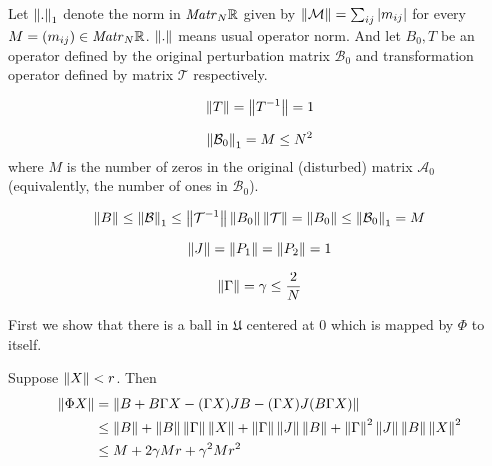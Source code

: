 \documentclass{article}
\begin{document}
\begin{propose}
    Let ${\left\|{.}\right\|}_{1}$ denote the norm in $\mathit{Matr}_{N} {\mathbb{R}}$ given by
    $\left\|{\mathcal M}\right\| = \sum_{ij} \left|m_{ij}\right|$ for every $M=(m_{ij})\in\mathit{Matr}_{N} {\mathbb{R}}$.
    $\left\|{.}\right\|$ means usual operator norm.
    And let $B_0, T$ be an operator defined by the original perturbation matrix $\mathcal B_0$
    and transformation operator defined by matrix $\mathcal T$ respectively.

    $$\left\|{T}\right\| = \left\|{T^{-1}}\right\| = 1$$

    $$\left\|{\mathcal B_0}\right\|_1 = M \leq N^2$$
    where $M$ is the number of zeros in the original (disturbed) matrix $\mathcal A_0$
    (equivalently, the number of ones in $\mathcal B_0$).

    $$\left\|{B}\right\| \leq {\left\|{\mathcal B}\right\|}_{1} \leq \left\|{\mathcal T^{-1}}\right\| \left\|{B_0}\right\| \left\|{\mathcal T}\right\| = \left\|{B_0}\right\| \leq {\left\|{\mathcal B_0}\right\|}_{1} = M$$

    $$\left\|{J}\right\| = \left\|{P_1}\right\| = \left\|{P_2}\right\| = 1$$

    $$\left\|{\Gamma}\right\| = \gamma \leq \frac{2}{N}$$
\end{propose}

First we show that there is a ball in $\mathfrak U$ centered at $0$
which is mapped by $\Phi$ to itself.

Suppose $\left\|{X}\right\| < r$.
Then
\begin{equation*}
    \begin{split}
        \left\|{\Phi X}\right\| &=    \left\|{B + B\Gamma X - (\Gamma X) JB - (\Gamma X)J(B\Gamma X)}\right\| \\
                     &\leq \left\|{B}\right\| + \left\|{B}\right\|\left\|{\Gamma}\right\| \left\|{X}\right\| + \left\|{\Gamma}\right\|\left\|{J}\right\|\left\|{B}\right\| + \left\|{\Gamma}\right\|^2\left\|{J}\right\|\left\|{B}\right\|\left\|{X}\right\|^2 \\
                     &\leq M + 2 \gamma M r + \gamma^2 M r^2
    \end{split}
\end{equation*}
\end{document}
